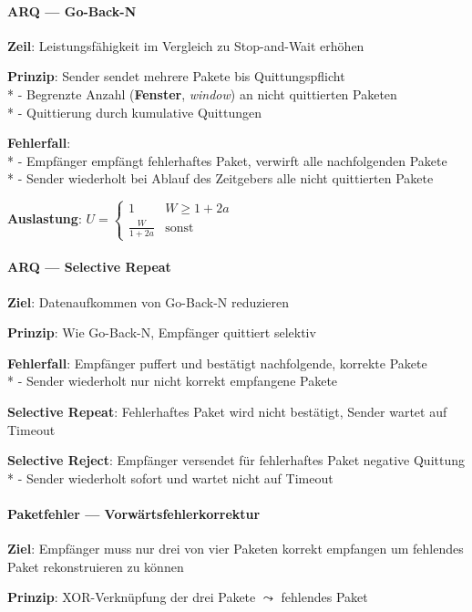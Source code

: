 \paragraph{ARQ --- Go-Back-N}
\begin{items}
  \item \textbf{Zeil}: Leistungsfähigkeit im Vergleich zu Stop-and-Wait erhöhen
  \item \textbf{Prinzip}: Sender sendet mehrere Pakete bis Quittungspflicht \\*
    - Begrenzte Anzahl (\textbf{Fenster}, \emph{window}) an nicht quittierten Paketen \\*
    - Quittierung durch kumulative Quittungen
  \item \textbf{Fehlerfall}: \\*
    - Empfänger empfängt fehlerhaftes Paket, verwirft alle nachfolgenden Pakete\\*
    - Sender wiederholt bei Ablauf des Zeitgebers alle nicht quittierten Pakete
  \item \textbf{Auslastung}: \( U = \begin{cases}
    1 & W \geq 1+2a \\
    \tfrac{W}{1+2a} & \text{sonst}
  \end{cases} \)
\end{items}

\paragraph{ARQ --- Selective Repeat}
\begin{items}
  \item \textbf{Ziel}: Datenaufkommen von Go-Back-N reduzieren
  \item \textbf{Prinzip}: Wie Go-Back-N, Empfänger quittiert selektiv
  \item \textbf{Fehlerfall}: Empfänger puffert und bestätigt nachfolgende, korrekte Pakete \\*
    - Sender wiederholt nur nicht korrekt empfangene Pakete
   \medskip
  \item \textbf{Selective Repeat}: Fehlerhaftes Paket wird nicht bestätigt, Sender wartet auf Timeout
  \item \textbf{Selective Reject}: Empfänger versendet für fehlerhaftes Paket negative Quittung \\*
    - Sender wiederholt sofort und wartet nicht auf Timeout
\end{items}

\paragraph{Paketfehler --- Vorwärtsfehlerkorrektur}
\begin{items}
  \item \textbf{Ziel}: Empfänger muss nur drei von vier Paketen korrekt empfangen um fehlendes Paket rekonstruieren zu können
  \item \textbf{Prinzip}: XOR-Verknüpfung der drei Pakete \( \leadsto \) fehlendes Paket
\end{items}

